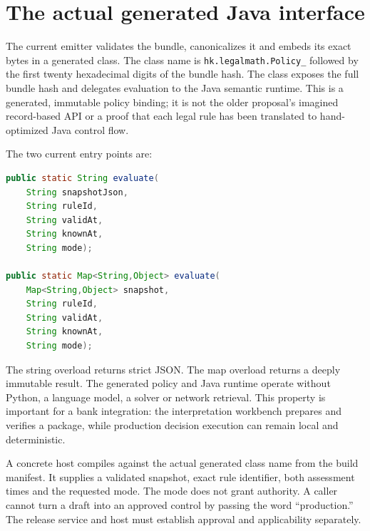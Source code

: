 \section{The actual generated Java interface}
\label{merge:M07:09}


The current emitter validates the bundle, canonicalizes it and embeds its exact
bytes in a generated class. The class name is
\texttt{hk.legalmath.Policy\_} followed by the first twenty hexadecimal digits of
the bundle hash. The class exposes the full bundle hash and delegates evaluation
to the Java semantic runtime. This is a generated, immutable policy binding; it
is not the older proposal's imagined record-based API or a proof that each legal
rule has been translated to hand-optimized Java control flow.

The two current entry points are:
\begin{lstlisting}[language=Java,caption={Implemented generated-policy API.}]
public static String evaluate(
    String snapshotJson,
    String ruleId,
    String validAt,
    String knownAt,
    String mode);

public static Map<String,Object> evaluate(
    Map<String,Object> snapshot,
    String ruleId,
    String validAt,
    String knownAt,
    String mode);
\end{lstlisting}

The string overload returns strict JSON. The map overload returns a deeply
immutable result. The generated policy and Java runtime operate without Python,
a language model, a solver or network retrieval. This property is important for
a bank integration: the interpretation workbench prepares and verifies a package,
while production decision execution can remain local and deterministic.

A concrete host compiles against the actual generated class name from the build
manifest. It supplies a validated snapshot, exact rule identifier, both assessment
times and the requested mode. The mode does not grant authority. A caller cannot
turn a draft into an approved control by passing the word ``production.'' The
release service and host must establish approval and applicability separately.

